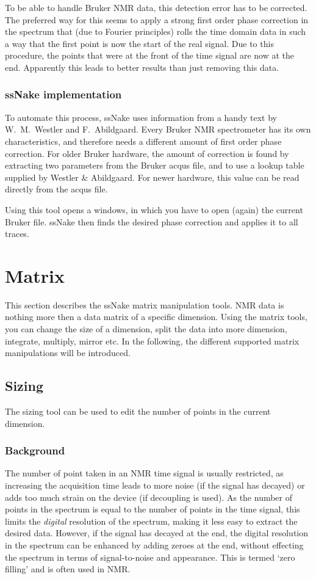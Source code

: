 \documentclass[11pt,a4paper]{article}
\begin{document}
To be able to handle Bruker NMR data, this detection error has to be corrected. The preferred way for this seems to apply a strong first order phase correction in the spectrum that (due to Fourier principles) rolls the time domain data in such a way that the first point is now the start of the real signal. Due to this procedure, the points that were at the front of the time signal are now at the end. Apparently this leads to better results than just removing this data.

\subsubsection*{ssNake implementation}
To automate this process, ssNake uses information from a handy text by W.\ M.\ Westler and F.\ Abildgaard. Every Bruker NMR spectrometer has its own characteristics, and therefore needs a different amount of first order phase correction. For older Bruker hardware, the amount of correction is found by extracting two parameters from the Bruker acqus file, and to use a lookup table supplied by Westler \& Abildgaard. For newer hardware, this value can be read directly from the acqus file.

Using this tool opens a windows, in which you have to open (again) the current Bruker file. ssNake then finds the desired phase correction and applies it to all traces. 


\section{Matrix}
This section describes the ssNake matrix manipulation tools. NMR data is nothing more then a data matrix of a specific dimension. Using the matrix tools, you can change the size of a dimension, split the data into more dimension, integrate, multiply, mirror etc. In the following, the different supported matrix manipulations will be introduced.


\subsection{Sizing}
The sizing tool can be used to edit the number of points in the current dimension. 

\subsubsection*{Background}
The number of point taken in an NMR time signal is usually restricted, as increasing the acquisition time leads to more noise (if the signal has decayed) or adds too much strain on the device (if decoupling is used). As the number of points in the spectrum is equal to the number of points in the time signal, this limits the \textit{digital} resolution of the spectrum, making it less easy to extract the desired data. However, if the signal has decayed at the end, the digital resolution in the spectrum can be enhanced by adding zeroes at the end, without effecting the spectrum in terms of signal-to-noise and appearance. This is termed `zero filling' and is often used in NMR.
\end{document}
